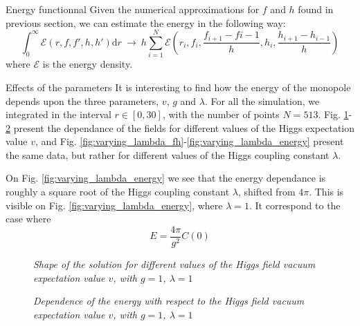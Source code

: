 \begin{subsection}{Energy functionnal}
  Given the numerical approximations for $f$ and $h$ found in previous
  section, we can estimate the energy in the following way:
  \begin{equation}
    \int_0^\infty \mathcal{E}(r, f, f', h, h')\mathrm d r \ \to\ h\sum_{i = 1}^N \mathcal{E}\left(r_i, f_i, \frac{f_{i+1}-f{i-1}}{h}, h_i, \frac{h_{i+1}-h_{i-1}}{h}\right)
  \end{equation}
  where $\mathcal{E}$ is the energy density.
\end{subsection}

\begin{subsection}{Effects of the parameters}
  It is interesting to find how the energy of the monopole depends
  upon the three parameters, $v$, $g$ and $\lambda$. For all the
  simulation, we integrated in the interval $r\in[0,30]$, with the
  number of points $N = 513$.
  Fig. \ref{fig:varying_vacuum_fh}-\ref{fig:varying_vacuum_energy}
  present the dependance of the fields for different values of the
  Higgs expectation value $v$, and
  Fig. \ref{fig:varying_lambda_fh}-\ref{fig:varying_lambda_energy}
  present the same data, but rather for different values of the Higgs
  coupling constant $\lambda$.

  On Fig. \ref{fig:varying_lambda_energy} we see that the energy
  dependance is roughly a square root of the Higgs coupling constant
  $\lambda$, shifted from $4\pi$. This is visible on
  Fig. \ref{fig:varying_lambda_energy}, where $\lambda = 1$. It
  correspond to the case where
  \begin{equation}
    E = \frac{4\pi}{g^2}C(0)
  \end{equation}

  \begin{figure}
    \begin{center}
      
      
      \caption{\em Shape of the solution for different values of the
        Higgs field vacuum expectation value $v$, with $g=1$, $\lambda = 1$}
      \label{fig:varying_vacuum_fh}
    \end{center}
  \end{figure}

  \begin{figure}
    \begin{center}
      
      \caption{\em Dependence of the energy with respect to the Higgs
        field vacuum expectation value $v$, with $g=1$, $\lambda = 1$}
      \label{fig:varying_vacuum_energy}
    \end{center}
  \end{figure}


\end{subsection}
